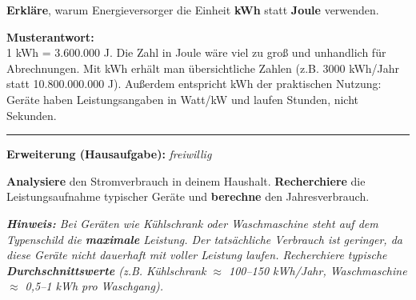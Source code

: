 \documentclass[11pt, a4paper]{article}
\newcommand{\operator}[1]{\textbf{\textcolor{fachfarbe}{#1}}}
\begin{document}
\operator{Erkläre}, warum Energieversorger die Einheit \textbf{kWh} statt \textbf{Joule} verwenden.

\vspace{0.5em}
\textcolor{loesung}{
\textbf{Musterantwort:}\\
1 kWh = 3.600.000 J. Die Zahl in Joule wäre viel zu groß und unhandlich für Abrechnungen. Mit kWh erhält man übersichtliche Zahlen (z.B. 3000 kWh/Jahr statt 10.800.000.000 J). Außerdem entspricht kWh der praktischen Nutzung: Geräte haben Leistungsangaben in Watt/kW und laufen Stunden, nicht Sekunden.
}


\vspace{1em}
\hrule
\vspace{0.8em}

\noindent\textbf{\textcolor{fachfarbe}{Erweiterung (Hausaufgabe):}} \hfill \textit{freiwillig}

\vspace{0.3em}
\noindent\operator{Analysiere} den Stromverbrauch in deinem Haushalt. \operator{Recherchiere} die Leistungsaufnahme typischer Geräte und \operator{berechne} den Jahresverbrauch.

\vspace{0.3em}
\small
\textit{\textbf{Hinweis:} Bei Geräten wie Kühlschrank oder Waschmaschine steht auf dem Typenschild die \textbf{maximale} Leistung. Der tatsächliche Verbrauch ist geringer, da diese Geräte nicht dauerhaft mit voller Leistung laufen. Recherchiere typische \textbf{Durchschnittswerte} (z.B. Kühlschrank $\approx$ 100--150 kWh/Jahr, Waschmaschine $\approx$ 0,5--1 kWh pro Waschgang).}
\normalsize
\end{document}
